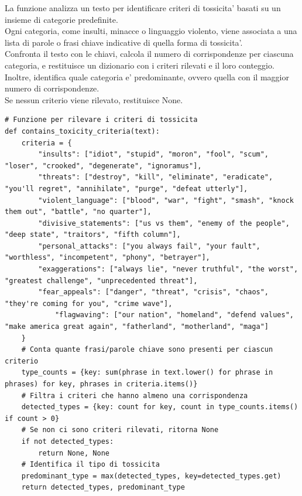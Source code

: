 \documentclass{article}
\begin{document}
La funzione analizza un testo per identificare criteri di tossicita' basati su un insieme di categorie predefinite. \\Ogni categoria, come insulti, minacce o linguaggio violento, viene associata a una lista di parole o frasi chiave indicative di quella forma di tossicita'.\\
Confronta il testo con le chiavi, calcola il numero di corrispondenze per ciascuna categoria, e restituisce un dizionario con i criteri rilevati e il loro conteggio. \\Inoltre, identifica quale categoria e' predominante, ovvero quella con il maggior numero di corrispondenze. \\Se nessun criterio viene rilevato, restituisce None.
	\begin{lstlisting}
# Funzione per rilevare i criteri di tossicita
def contains_toxicity_criteria(text):
	criteria = {
		"insults": ["idiot", "stupid", "moron", "fool", "scum", "loser", "crooked", "degenerate", "ignoramus"],
		"threats": ["destroy", "kill", "eliminate", "eradicate", "you'll regret", "annihilate", "purge", "defeat utterly"],
		"violent_language": ["blood", "war", "fight", "smash", "knock them out", "battle", "no quarter"],
		"divisive_statements": ["us vs them", "enemy of the people", "deep state", "traitors", "fifth column"],
		"personal_attacks": ["you always fail", "your fault", "worthless", "incompetent", "phony", "betrayer"],
		"exaggerations": ["always lie", "never truthful", "the worst", "greatest challenge", "unprecedented threat"],
		"fear_appeals": ["danger", "threat", "crisis", "chaos", "they're coming for you", "crime wave"],
			"flagwaving": ["our nation", "homeland", "defend values", "make america great again", "fatherland", "motherland", "maga"]
	}
	# Conta quante frasi/parole chiave sono presenti per ciascun criterio
	type_counts = {key: sum(phrase in text.lower() for phrase in phrases) for key, phrases in criteria.items()}
	# Filtra i criteri che hanno almeno una corrispondenza
	detected_types = {key: count for key, count in type_counts.items() if count > 0}
	# Se non ci sono criteri rilevati, ritorna None
	if not detected_types:
		return None, None
	# Identifica il tipo di tossicita
	predominant_type = max(detected_types, key=detected_types.get)
	return detected_types, predominant_type
	\end{lstlisting}
	
\end{document}
